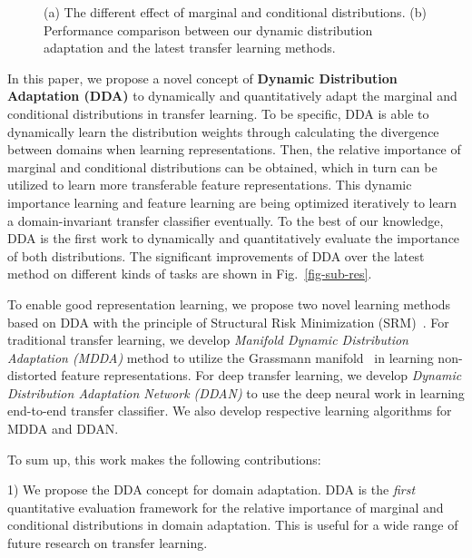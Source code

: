 \documentclass[acmsmall]{acmart}
\begin{document}
\begin{figure}[t!]
	\centering
	\hspace{.2in}
	
	\caption{(a) The different effect of marginal and conditional distributions. (b) Performance comparison between our dynamic distribution adaptation and the latest transfer learning methods.}
	\label{fig-intro}
\end{figure}

In this paper, we propose a novel concept of \textbf{Dynamic Distribution Adaptation (DDA)} to dynamically and quantitatively adapt the marginal and conditional distributions in transfer learning. To be specific, DDA is able to dynamically learn the distribution weights through calculating the  divergence~\cite{ben2007analysis} between domains when learning representations. Then, the relative importance of marginal and conditional distributions can be obtained, which in turn can be utilized to learn more transferable feature representations. This dynamic importance learning and feature learning are being optimized iteratively to learn a domain-invariant transfer classifier eventually. To the best of our knowledge, DDA is the first work to dynamically and quantitatively evaluate the importance of both distributions. The significant improvements of DDA over the latest method on different kinds of tasks are shown in Fig.~\ref{fig-sub-res}.

To enable good representation learning, we propose two novel learning methods based on DDA with the principle of Structural Risk Minimization (SRM)~\cite{vapnik1998statistical}. For traditional transfer learning, we develop \textit{Manifold Dynamic Distribution Adaptation (MDDA)} method to utilize the Grassmann manifold~\cite{hamm2008grassmann} in learning non-distorted feature representations. For deep transfer learning, we develop \textit{Dynamic Distribution Adaptation Network (DDAN)} to use the deep neural work in learning end-to-end transfer classifier. We also develop respective learning algorithms for MDDA and DDAN. 

To sum up, this work makes the following contributions:

1) We propose the DDA concept for domain adaptation. DDA is the \textit{first} quantitative evaluation framework for the relative importance of marginal and conditional distributions in domain adaptation. This is useful for a wide range of future research on transfer learning.
\end{document}
